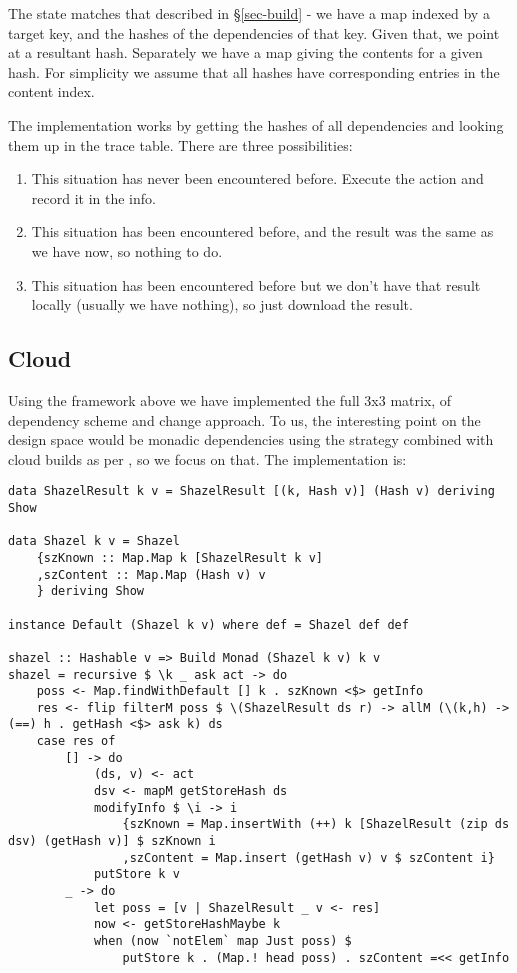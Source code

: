 The state matches that described in \S\ref{sec-build} - we have a map indexed by a target key, and the hashes of the dependencies of that key. Given that, we point at a resultant hash. Separately we have a map giving the contents for a given hash. For simplicity we assume that all hashes have corresponding entries in the content index.

The implementation works by getting the hashes of all dependencies and looking them up in the trace table. There are three possibilities:

\begin{enumerate}
\item This situation has never been encountered before. Execute the action and record it in the info.
\item This situation has been encountered before, and the result was the same as we have now, so nothing to do.
\item This situation has been encountered before but we don't have that result locally (usually we have nothing), so just download the result.
\end{enumerate}

\subsection{Cloud \Shake}\label{sec-implementation-cloud-shake}

Using the framework above we have implemented the full 3x3 matrix, of dependency scheme and change approach. To us, the interesting point on the design space would be monadic dependencies using the  strategy combined with cloud builds as per \Bazel, so we focus on that. The implementation is:

\begin{verbatim}
data ShazelResult k v = ShazelResult [(k, Hash v)] (Hash v) deriving Show

data Shazel k v = Shazel
    {szKnown :: Map.Map k [ShazelResult k v]
    ,szContent :: Map.Map (Hash v) v
    } deriving Show

instance Default (Shazel k v) where def = Shazel def def

shazel :: Hashable v => Build Monad (Shazel k v) k v
shazel = recursive $ \k _ ask act -> do
    poss <- Map.findWithDefault [] k . szKnown <$> getInfo
    res <- flip filterM poss $ \(ShazelResult ds r) -> allM (\(k,h) -> (==) h . getHash <$> ask k) ds
    case res of
        [] -> do
            (ds, v) <- act
            dsv <- mapM getStoreHash ds
            modifyInfo $ \i -> i
                {szKnown = Map.insertWith (++) k [ShazelResult (zip ds dsv) (getHash v)] $ szKnown i
                ,szContent = Map.insert (getHash v) v $ szContent i}
            putStore k v
        _ -> do
            let poss = [v | ShazelResult _ v <- res]
            now <- getStoreHashMaybe k
            when (now `notElem` map Just poss) $
                putStore k . (Map.! head poss) . szContent =<< getInfo
\end{verbatim}

